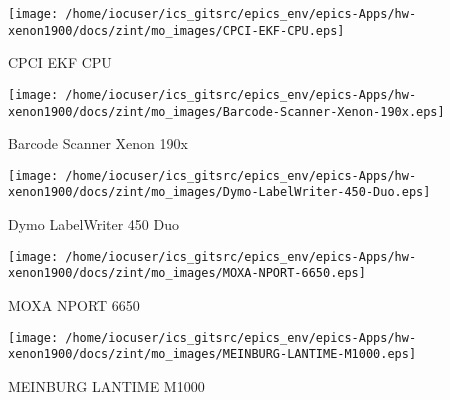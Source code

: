 \noindent
\vspace{1.4cm}
\begin{minipage}{.2\textwidth}
\begin{center}
\texttt{[image: /home/iocuser/ics\_gitsrc/epics\_env/epics-Apps/hw-xenon1900/docs/zint/mo\_images/CPCI-EKF-CPU.eps]}
\end{center}
\end{minipage}
\begin{minipage}{.7\textwidth}
CPCI EKF CPU 
\end{minipage}


\noindent
\vspace{1.4cm}
\begin{minipage}{.2\textwidth}
\begin{center}
\texttt{[image: /home/iocuser/ics\_gitsrc/epics\_env/epics-Apps/hw-xenon1900/docs/zint/mo\_images/Barcode-Scanner-Xenon-190x.eps]}
\end{center}
\end{minipage}
\begin{minipage}{.7\textwidth}
Barcode Scanner Xenon 190x
\end{minipage}


\noindent
\vspace{1.4cm}
\begin{minipage}{.2\textwidth}
\begin{center}
\texttt{[image: /home/iocuser/ics\_gitsrc/epics\_env/epics-Apps/hw-xenon1900/docs/zint/mo\_images/Dymo-LabelWriter-450-Duo.eps]}
\end{center}
\end{minipage}
\begin{minipage}{.7\textwidth}
Dymo LabelWriter 450 Duo
\end{minipage}


\noindent
\vspace{1.4cm}
\begin{minipage}{.2\textwidth}
\begin{center}
\texttt{[image: /home/iocuser/ics\_gitsrc/epics\_env/epics-Apps/hw-xenon1900/docs/zint/mo\_images/MOXA-NPORT-6650.eps]}
\end{center}
\end{minipage}
\begin{minipage}{.7\textwidth}
MOXA NPORT 6650
\end{minipage}


\noindent
\vspace{1.4cm}
\begin{minipage}{.2\textwidth}
\begin{center}
\texttt{[image: /home/iocuser/ics\_gitsrc/epics\_env/epics-Apps/hw-xenon1900/docs/zint/mo\_images/MEINBURG-LANTIME-M1000.eps]}
\end{center}
\end{minipage}
\begin{minipage}{.7\textwidth}
MEINBURG LANTIME M1000
\end{minipage}


